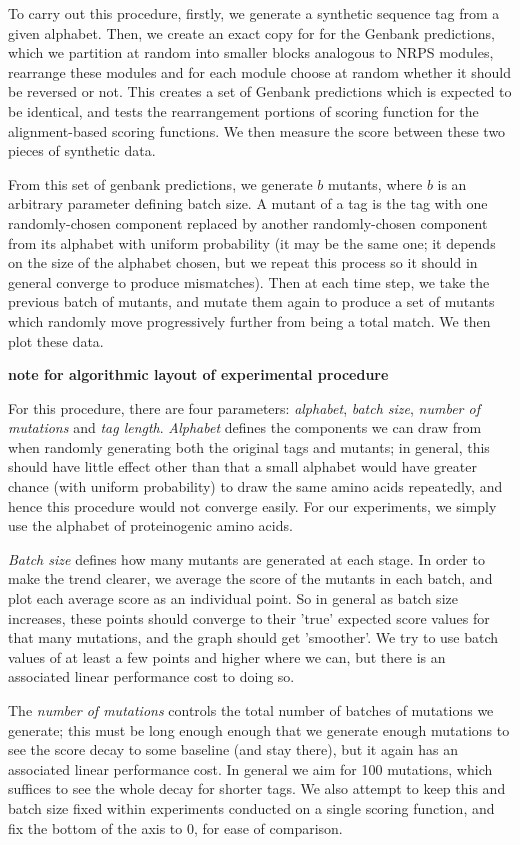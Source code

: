 \documentclass{l4proj}
\begin{document}
To carry out this procedure, firstly, we generate a synthetic sequence tag from a given alphabet. Then, we create an exact copy for for the Genbank predictions, which we partition at random into smaller blocks analogous to NRPS modules, rearrange these modules and for each module choose at random whether it should be reversed or not. This creates a set of Genbank predictions which is expected to be identical, and tests the rearrangement portions of scoring function for the alignment-based scoring functions. We then measure the score between these two pieces of synthetic data.

From this set of genbank predictions, we generate \(b\) mutants, where \(b\) is an arbitrary parameter defining batch size.  A mutant of a tag is the tag with one randomly-chosen component replaced by another randomly-chosen component from its alphabet with uniform probability (it may be the same one; it depends on the size of the alphabet chosen, but we repeat this process so it should in general converge to produce mismatches). Then at each time step, we take the previous batch of mutants, and mutate them again to produce a set of mutants which randomly move progressively further from being a total match. We then plot these data. 

\textbf{note for algorithmic layout of experimental procedure}

For this procedure, there are four parameters: \textit{alphabet}, \textit{batch size}, \textit{number of mutations} and \textit{tag length}. \textit{Alphabet} defines the components we can draw from when randomly generating both the original tags and mutants; in general, this should have little effect other than that a small alphabet would have greater chance (with uniform probability) to draw the same amino acids repeatedly, and hence this procedure would not converge easily. For our experiments, we simply use the alphabet of proteinogenic amino acids.

\textit{Batch size} defines how many mutants are generated at each stage. In order to make the trend clearer, we average the score of the mutants in each batch, and plot each average score as an individual point. So in general as batch size increases, these points should converge to their 'true' expected score values for that many mutations, and the graph should get 'smoother'. We try to use batch values of at least a few points and higher where we can, but there is an associated linear performance cost to doing so.

The \textit{number of mutations} controls the total number of batches of mutations we generate; this must be long enough enough that we generate enough mutations to see the score decay to some baseline (and stay there), but it again has an associated linear performance cost. In general we aim for 100 mutations, which suffices to see the whole decay for shorter tags. We also attempt to keep this and batch size fixed within experiments conducted on a single scoring function, and fix the bottom of the axis to 0, for ease of comparison.
\end{document}
